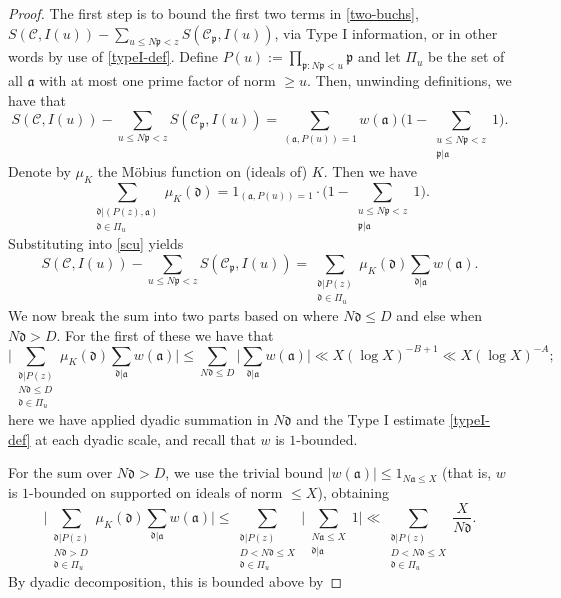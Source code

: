 \documentclass[11pt,reqno]{amsart}
\numberwithin{equation}{section}
\theoremstyle{definition}
\theoremstyle{remark}
\newcommand{\mc}{\mathcal}
\newcommand{\mf}{\mathfrak}
\renewcommand{\le}{\leqslant}
\renewcommand{\ge}{\geqslant}
\begin{document}
\begin{proof}
The first step is to bound the first two terms in \eqref{two-buchs}, $S(\mc{C},I(u)) - \sum_{u \le  N\mf{p}<z}S(\mc{C}_{\mf{p}},I(u))$, via Type I information, or in other words by use of \cref{typeI-def}. Define $P(u) := \prod_{\mf{p} : N\mf{p} < u} \mf{p}$ and let $\Pi_u$ be the set of all $\mf{a}$ with at most one prime factor of norm $\ge u$. Then, unwinding definitions, we have that 
\begin{equation}\label{scu}S(\mc{C},I(u)) - \sum_{u \le N \mf{p}<z}S(\mc{C}_\mf{p},I(u)) = \sum_{(\mf{a}, P(u)) = 1}w(\mf{a})\bigg(1 - \sum_{\substack{u \le  N\mf{p}<z\\ \mf{p}|\mf{a}}} 1\bigg).\end{equation}
Denote by $\mu_K$ the M\"obius function on (ideals of) $K$. Then we have
\[ \sum_{\substack{\mf{d} | (P(z), \mf{a}) \\ \mf{d} \in \Pi_u }} \mu_K(\mf{d}) = 1_{(\mf{a}, P(u)) = 1} \cdot \bigg(1 - \sum_{\substack{u \le N\mf{p}<z\\ \mf{p}|\mf{a}}} 1\bigg).\]
Substituting into \cref{scu} yields
\begin{equation}\label{subst3} S(\mc{C},I(u)) - \sum_{u \le N\mf{p}<z}S(\mc{C}_\mf{p},I(u)) = \sum_{\substack{\mf{d}|P(z)\\\mf{d}\in \Pi_u}}\mu_K(\mf{d})\sum_{\mf{d}|\mf{a}}w(\mf{a}).\end{equation}
We now break the sum into two parts based on where $N \mf{d}\le D$ and else when $N \mf{d}>D$. For the first of these we have that 
\begin{equation}\label{sum-small-d}
\Big|\sum_{\substack{\mf{d}|P(z)\\ N \mf{d} \le D\\ \mf{d}\in \Pi_u}}\mu_K(\mf{d})\sum_{\mf{d}|\mf{a}}w(\mf{a})\Big| \le \sum_{N\mf{d}\le D}\Big|\sum_{\mf{d}|\mf{a}} w(\mf{a})\Big|\ll X(\log X)^{-B+1} \ll X (\log X)^{-A};
\end{equation}
here we have applied dyadic summation in $N \mf{d}$ and the Type I estimate \cref{typeI-def} at each dyadic scale, and recall that $w$ is $1$-bounded.

For the sum over $N\mf{d} >D$, we use the trivial bound $|w(\mf{a})| \le 1_{N\mf{a} \le X}$ (that is, $w$ is $1$-bounded on supported on ideals of norm $\le X$), obtaining
\begin{equation}\label{209}
\Big|\sum_{\substack{\mf{d}|P(z)\\ N \mf{d} > D\\ \mf{d}\in \Pi_u}}\mu_K(\mf{d})\sum_{\mf{d}|\mf{a}}w(\mf{a})\Big|  \le \sum_{\substack{\mf{d} | P(z) \\ D < N\mf{d} \le X \\ \mf{d} \in \Pi_u}} \Big| \sum_{\substack{N\mf{a} \le X \\ \mf{d} | \mf{a}}} 1 \Big|    \ll   \sum_{\substack{\mf{d} | P(z) \\ D < N\mf{d} \le X \\ \mf{d} \in \Pi_u}} \frac{X}{N\mf{d}}.
\end{equation}
By dyadic decomposition, this is bounded above by


\end{proof}
\end{document}
